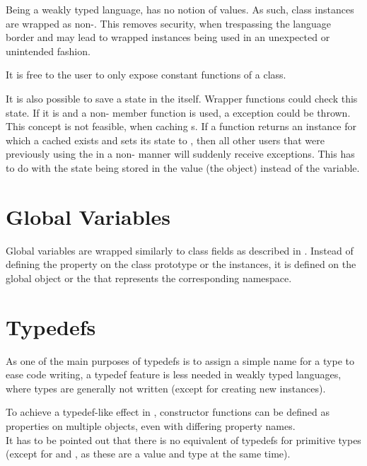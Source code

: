 Being a weakly typed language,  has no notion of  values. As such,  class instances are wrapped as non-. This removes security, when trespassing the language border and may lead to wrapped instances being used in an unexpected or unintended fashion.

It is free to the  user to only expose constant functions of a class.

It is also possible to save a  state in the  itself. Wrapper functions could check this state. If it is  and a non- member function is used, a  exception could be thrown.\\
This concept is not feasible, when caching s. If a  function returns an instance for which a cached  exists and sets its  state to , then all other users that were previously using the  in a non- manner will suddenly receive exceptions. This has to do with the  state being stored in the value (the object) instead of the variable.

\section{Global Variables}

Global variables are wrapped similarly to class fields as described in . Instead of defining the property on the class prototype or the instances, it is defined on the global  object or the  that represents the \linebreak corresponding namespace.

\section{Typedefs}

As one of the main purposes of typedefs is to assign a simple name for a  type to ease code writing, a typedef feature is less needed in weakly typed languages, where types are generally not written (except for creating new instances).

To achieve a typedef-like effect in , constructor functions can be defined as properties on multiple objects, even with differing property names.\\
It has to be pointed out that there is no equivalent of typedefs for primitive types (except for  and , as these are a value and type at the same time).

